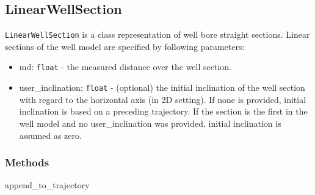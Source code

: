 	\subsection{LinearWellSection}
	\texttt{LinearWellSection} is a class representation of well bore straight sections. Linear sections of the well model are specified by following parameters:
	\begin{itemize}
		\item  \colorbox{gray!20}{md:} \texttt{float} - the measured distance over the well section.
		\item  \colorbox{gray!20}{user\_inclination:} \texttt{float} - (optional) the initial inclination of the well section with regard to the horizontal axis (in 2D setting). If none is provided, initial inclination is based on a preceding trajectory. If the section is the first in the well model and no user\_inclination was provided, initial inclination is assumed as zero.
	\end{itemize}
	\subsubsection{Methods}
	\begin{description}
		\item[\colorbox{gray!20}{append\_to\_trajectory}] \hfill
	\end{description}
